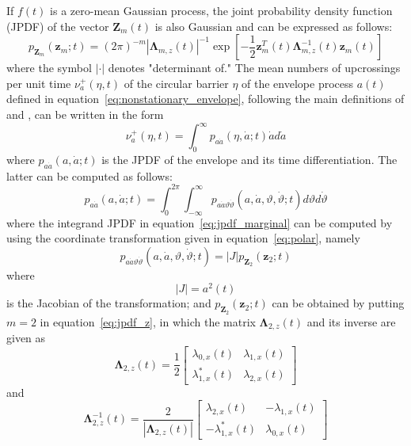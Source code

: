 \documentclass[11pt]{article}
\begin{document}
If $f(t)$ is a zero-mean Gaussian process, the joint probability density function (JPDF) of the vector $\mathbf{Z}_m(t)$ is also Gaussian and can be expressed as follows:
\begin{equation}
p_{\mathbf{Z}_m}(\mathbf{z}_m; t) = (2\pi)^{-m} |\boldsymbol{\Lambda}_{m,z}(t)|^{-1} \exp\left[-\frac{1}{2}\mathbf{z}_m^T(t) \boldsymbol{\Lambda}_{m,z}^{-1}(t) \mathbf{z}_m(t)\right]
\label{eq:jpdf_z}
\end{equation}
where the symbol $|\cdot|$ denotes "determinant of." The mean numbers of upcrossings per unit time $\nu_a^+(\eta, t)$ of the circular barrier $\eta$ of the envelope process $a(t)$ defined in equation~\eqref{eq:nonstationary_envelope}, following the main definitions of \cite{rice1955} and \cite{middleton1960}, can be written in the form
\begin{equation}
\nu_a^+(\eta, t) = \int_0^{\infty} p_{a\dot{a}}(\eta, \dot{a}; t) \dot{a} d\dot{a}
\label{eq:upcrossing_rate}
\end{equation}
where $p_{a\dot{a}}(a, \dot{a}; t)$ is the JPDF of the envelope and its time differentiation. The latter can be computed as follows:
\begin{equation}
p_{a\dot{a}}(a, \dot{a}; t) = \int_0^{2\pi} \int_{-\infty}^{\infty} p_{a\dot{a}\vartheta\dot{\vartheta}}(a, \dot{a}, \vartheta, \dot{\vartheta}; t) d\vartheta d\dot{\vartheta}
\label{eq:jpdf_marginal}
\end{equation}
where the integrand JPDF in equation~\eqref{eq:jpdf_marginal} can be computed by using the coordinate transformation given in equation~\eqref{eq:polar}, namely
\begin{equation}
p_{a\dot{a}\vartheta\dot{\vartheta}}(a, \dot{a}, \vartheta, \dot{\vartheta}; t) = |J| p_{\mathbf{Z}_2}(\mathbf{z}_2; t)
\label{eq:jacobian_transform}
\end{equation}
where
\begin{equation}
|J| = a^2(t)
\label{eq:jacobian}
\end{equation}
is the Jacobian of the transformation; and $p_{\mathbf{Z}_2}(\mathbf{z}_2; t)$ can be obtained by putting $m = 2$ in equation~\eqref{eq:jpdf_z}, in which the matrix $\boldsymbol{\Lambda}_{2,z}(t)$ and its inverse are given as
\begin{equation}
\boldsymbol{\Lambda}_{2,z}(t) = \frac{1}{2}\begin{bmatrix}
\lambda_{0,x}(t) & \lambda_{1,x}(t) \\
\lambda_{1,x}^*(t) & \lambda_{2,x}(t)
\end{bmatrix}
\label{eq:lambda_2z}
\end{equation}
and
\begin{equation}
\boldsymbol{\Lambda}_{2,z}^{-1}(t) = \frac{2}{|\boldsymbol{\Lambda}_{2,z}(t)|} \begin{bmatrix}
\lambda_{2,x}(t) & -\lambda_{1,x}(t) \\
-\lambda_{1,x}^*(t) & \lambda_{0,x}(t)
\end{bmatrix}
\label{eq:lambda_2z_inverse}
\end{equation}
\end{document}
